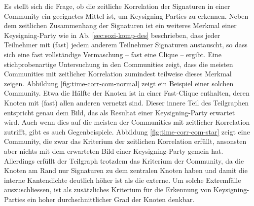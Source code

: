 Es stellt sich die Frage, ob die zeitliche Korrelation der Signaturen
in einer Community ein geeignetes Mittel ist, um Keysigning-Parties zu
erkennen. Neben dem zeitlichen Zusammenhang der Signaturen ist ein
weiteres Merkmal einer Keysigning-Party wie in
Ab. \ref{sec:sozi-komp-des} beschrieben, dass jeder Teilnehmer mit
(fast) jedem anderem Teilnehmer Signaturen austauscht, so dass sich
eine fast vollst\"andige Vermaschung -- fast eine Clique --
ergibt. Eine stichprobenartige Untersuchung in den Communities zeigt,
dass die meisten Communities mit zeitlicher Korrelation zumindest
teilweise dieses Merkmal zeigen. Abbildung
\ref{fig:time-corr-com-normal} zeigt ein Beispiel einer solchen
Community. Etwa die H\"alfte der Knoten ist in einer Fast-Clique
enthalten, deren Knoten mit (fast) allen anderen vernetzt sind. Dieser
innere Teil des Teilgraphen entspricht genau dem Bild, das als
Resultat einer Keysigning-Party erwartet wird. Auch wenn dies auf die
meisten der Communities mit zeitlicher Korrelation zutrifft, gibt es
auch Gegenbeispiele. Abbildung \ref{fig:time-corr-com-star} zeigt eine
Community, die zwar das Kriterium der zeitlichen Korrelation
erf\"ullt, ansonsten aber nichts mit dem erwarteten Bild einer
Keysigning-Party gemein hat. Allerdings erf\"ullt der Teilgraph
trotzdem das Kriterium der Community, da die Knoten am Rand nur
Signaturen zu dem zentralen Knoten haben und damit die interne
Kantendichte deutlich h\"oher ist als die externe. Um solche
Extremf\"alle auszuschliessen, ist als zus\"atzliches Kriterium f\"ur
die Erkennung von Keysigning-Parties ein hoher durchschnittlicher Grad
der Knoten denkbar.


